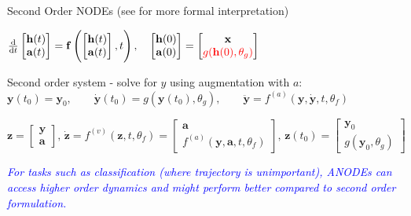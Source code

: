 \documentclass[usenames,dvipsnames]{beamer}
\theoremstyle{definition}
\let\oldcite=\cite
\renewcommand{\cite}[2][]{\textcolor{green}{\oldcite[#1]{#2}}}
\begin{document}
\begin{frame}{Second Order NODEs}
    (see \cite{Norcliffe2020} for more formal interpretation)

    $\frac{\mathrm d}{\mathrm dt}\begin{bmatrix}\mathbf h(t)\\\mathbf a(t)\end{bmatrix}=\mathbf f\left(\begin{bmatrix}\mathbf h(t)\\\mathbf a(t)\end{bmatrix}, t\right),\quad\begin{bmatrix}\mathbf h(0)\\\mathbf a(0)\end{bmatrix}=\begin{bmatrix}\mathbf x\\\textcolor{red}{g(\mathbf{h}(0), \theta_g)}\end{bmatrix}$

    Second order system  - solve for $y$ using augmentation with $a$:
    $\mathbf{y}(t_0)=\mathbf{y}_0,\quad\quad\dot{\mathbf{y}}(t_0)=g(\mathbf{y}(t_0),\theta_g),\quad\quad\ddot{\mathbf{y}}=f^{(a)}(\mathbf{y},\dot{\mathbf{y}},t,\theta_f)$

    $\mathbf{z}=\begin{bmatrix}\mathbf{y}\\\mathbf{a}\end{bmatrix},\, \dot{\mathbf{z}}=f^{(v)}(\mathbf{z},t,\theta_f)=\begin{bmatrix}\mathbf{a}\\f^{(a)}(\mathbf{y},\mathbf{a},t,\theta_f)\end{bmatrix},\,\mathbf{z}(t_0)=\begin{bmatrix}\mathbf{y}_0\\g(\mathbf{y}_0,\theta_g)\end{bmatrix}$

    \textcolor{blue}{\emph{For tasks such as classification (where trajectory is unimportant), ANODEs can access higher order dynamics and might perform better compared to second order formulation.}}

\end{frame}

\end{document}
